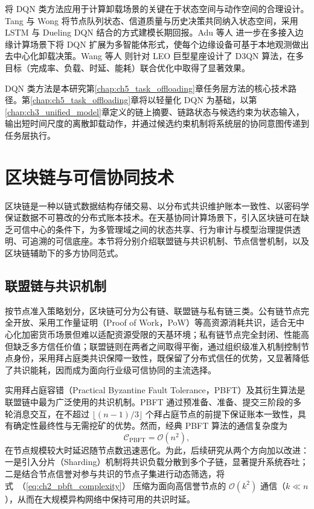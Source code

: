 将 DQN 类方法应用于计算卸载场景的关键在于状态空间与动作空间的合理设计。Tang 与 Wong\cite{Tang2022DRL} 将节点队列状态、信道质量与历史决策共同纳入状态空间，采用 LSTM 与 Dueling DQN 结合的方式建模长期回报。Adu 等人\cite{Adu2026MADRL} 进一步在多接入边缘计算场景下将 DQN 扩展为多智能体形式，使每个边缘设备可基于本地观测做出去中心化卸载决策。Wang 等人\cite{LMCECN2025} 则针对 LEO 巨型星座设计了 D3QN 算法，在多目标（完成率、负载、时延、能耗）联合优化中取得了显著效果。

DQN 类方法是本研究第\ref{chap:ch5_task_offloading}章任务层方法的核心技术路径。第\ref{chap:ch5_task_offloading}章将以轻量化 DQN 为基础，以第\ref{chap:ch3_unified_model}章定义的链上摘要、链路状态与候选约束为状态输入，输出短时间尺度的离散卸载动作，并通过候选约束机制将系统层的协同意图传递到任务层执行。

\section{区块链与可信协同技术}
\label{sec:ch2_blockchain}

区块链是一种以链式数据结构存储交易、以分布式共识维护账本一致性、以密码学保证数据不可篡改的分布式账本技术\cite{ref3,ref13,ETSI2024BCFL,Villegas2025BETAC}。在天基协同计算场景下，引入区块链可在缺乏可信中心的条件下，为多管理域之间的状态共享、行为审计与模型治理提供透明、可追溯的可信底座\cite{ref12,ref15,ZhangLEO2024,Elmahallawy2025}。本节将分别介绍联盟链与共识机制、节点信誉机制，以及区块链辅助下的多方协同范式。

\subsection{联盟链与共识机制}
\label{subsec:ch2_consortium}

按节点准入策略划分，区块链可分为公有链、联盟链与私有链三类。公有链节点完全开放、采用工作量证明（Proof of Work，PoW）等高资源消耗共识，适合无中心化加密货币场景但难以适配资源受限的天基环境；私有链节点完全封闭、性能高但缺乏多方信任价值；联盟链则在两者之间取得平衡，通过组织级准入机制控制节点身份，采用拜占庭类共识保障一致性，既保留了分布式信任的优势，又显著降低了共识能耗，因而成为面向行业级可信协同的主流选择\cite{ETSI2024BCFL,NetTopoBFT2025}。

实用拜占庭容错（Practical Byzantine Fault Tolerance，PBFT）及其衍生算法是联盟链中最为广泛使用的共识机制。PBFT 通过预准备、准备、提交三阶段的多轮消息交互，在不超过 $\lfloor (n-1)/3 \rfloor$ 个拜占庭节点的前提下保证账本一致性，具有确定性最终性与无需挖矿的优势\cite{Lamport1982Byzantine,Castro1999,NetTopoBFT2025}。然而，经典 PBFT 算法的通信复杂度为
\begin{equation}
  \mathcal{C}_{\mathrm{PBFT}} = \mathcal{O}(n^2),
  \label{eq:ch2_pbft_complexity}
\end{equation}
在节点规模较大时延迟随节点数迅速恶化。为此，后续研究从两个方向加以改进：一是引入分片（Sharding）机制将共识负载分散到多个子链，显著提升系统吞吐\cite{ZhangLEO2024}；二是结合节点信誉对参与共识的节点子集进行动态筛选，将式~（\ref{eq:ch2_pbft_complexity}） 压缩为面向高信誉节点的 $\mathcal{O}(k^2)$ 通信（$k \ll n$），从而在大规模异构网络中保持可用的共识时延\cite{NetTopoBFT2025}。

